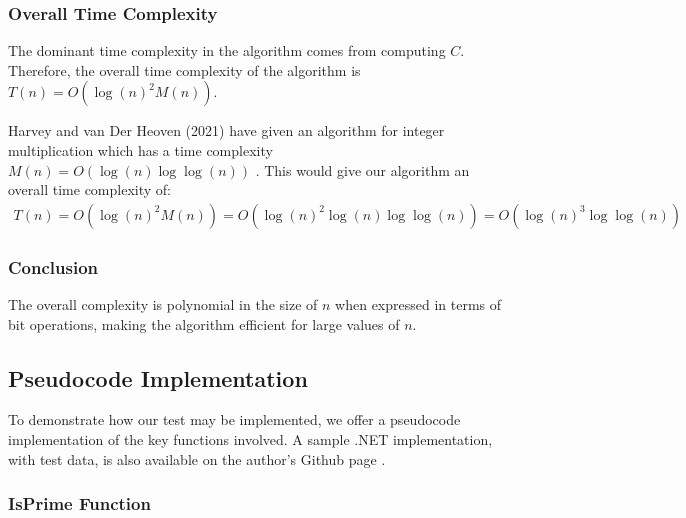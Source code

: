 \documentclass{article}
\theoremstyle{plain}
\theoremstyle{definition}
\begin{document}
\subsubsection{Overall Time Complexity}
The dominant time complexity in the algorithm comes from computing \( C \). Therefore, the overall time complexity of the algorithm is \( T(n) = O(\log(n)^2 M(n)) \).

Harvey and van Der Heoven (2021) have given an algorithm for integer multiplication which has a time complexity $M(n) = O(\log(n) \log\log(n))$ \cite{harveyvanderhoeven2021}. This would give our algorithm an overall time complexity of:
\begin{align}
    T(n) = O(\log(n)^2 M(n)) = O(\log(n)^2 \log(n) \log\log(n)) = O(\log(n)^3 \log\log(n))
\end{align}

\subsubsection{Conclusion}
The overall complexity is polynomial in the size of \( n \) when expressed in terms of bit operations, making the algorithm efficient for large values of \( n \).

\subsection{Pseudocode Implementation}
To demonstrate how our test may be implemented, we offer a pseudocode implementation of the key functions involved. A sample .NET implementation, with test data, is also available on the author's Github page \cite{githubrepo}.

\subsubsection{IsPrime Function}
\end{document}
